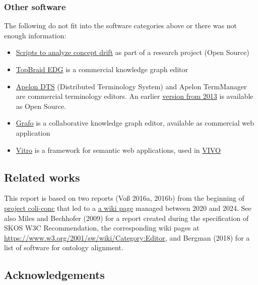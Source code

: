 \documentclass[
  DIV=10]{article}
\providecommand{\tightlist}{%
  \setlength{\itemsep}{0pt}\setlength{\parskip}{0pt}}
\begin{document}
\subsubsection{Other software}\label{other-software}

The following do not fit into the software categories above or there was
not enough information:

\begin{itemize}
\tightlist
\item
  \href{https://github.com/Multilingual-LGBTQIA-Vocabularies/Examing_LGBTQ_Concepts}{Scripts
  to analyze concept drift} as part of a research project (Open Source)
\item
  \href{https://www.topquadrant.com/topbraid-edg/}{TopBraid EDG} is a
  commercial knowledge graph editor
\item
  \href{https://www.apelondts.org/}{Apelon DTS} (Distributed Terminology
  System) and Apelon TermManager are commercial terminology editors. An
  earlier \href{https://apelon-dts.sourceforge.net/}{version from 2013}
  is available as Open Source.
\item
  \href{https://gra.fo/}{Grafo} is a collaborative knowledge graph
  editor, available as commercial web application
\item
  \href{https://github.com/vivo-project/Vitro}{Vitro} is a framework for
  semantic web applications, used in \href{https://vivoweb.org/}{VIVO}
\end{itemize}

\subsection{Related works}\label{related-works}

This report is based on two reports (Voß 2016a, 2016b) from the
beginning of \href{https://coli-conc.gbv.de/}{project coli-conc} that
led to a
\href{https://github.com/gbv/bartoc.org/wiki/Software-for-controlled-vocabularies}{a
wiki page} managed between 2020 and 2024. See also Miles and Bechhofer
(2009) for a report created during the specification of SKOS W3C
Recommendation, the corresponding wiki pages at
\url{https://www.w3.org/2001/sw/wiki/Category:Editor}, and Bergman
(2018) for a list of software for ontology alignment.

\subsection{Acknowledgements}\label{acknowledgements}
\end{document}
